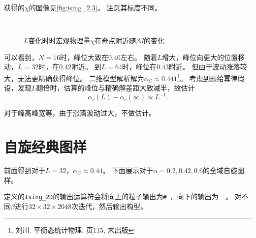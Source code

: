 \documentclass[a4paper,unicode]{report}
\begin{document}
获得的$\chi$的图像见\autoref{fig:ising_2.3}。
注意其标度不同。

\begin{figure}
    \centering
\\
    \caption{$L$变化时时宏观物理量$\chi$在奇点附近随$\beta J$的变化}
    \label{fig:ising_2.3}
\end{figure}

可以看到，$N=16$时，峰位大致在$0.40$左右。
随着$L$增大，峰位向更大的位置移动，$L=32$时，在$0.42$附近。
到$L=64$时，峰位在$0.43$附近。
但由于波动涨落较大，无法更精确获得峰位。
二维模型解析解为$\alpha_C\approx 0.441$\footnote{刘川. 平衡态统计物理. 页115, 未出版}。
考虑到题给幂律假设，发现$L$翻倍时，估算的峰位与精确解差距大致减半，故估计
\begin{equation}
    \alpha_c (L) − \alpha_ c (\infty) \propto L^{-1}.
\end{equation}

对于峰高峰宽等，由于涨落波动过大，不做估计。


\section{自旋经典图样}
前面得到对于$L=32$，$\alpha_C \approx 0.44$。
下面展示对于$\alpha = 0.2, 0.42, 0.6$的全域自旋图样。

定义的\verb|Ising_2D|的输出运算符会将向上的粒子输出为\verb*|# |，向下的输出为\verb|  |。
对不同$\beta$进行$32\times 32\times 2048$次迭代，然后输出构型。
\end{document}
